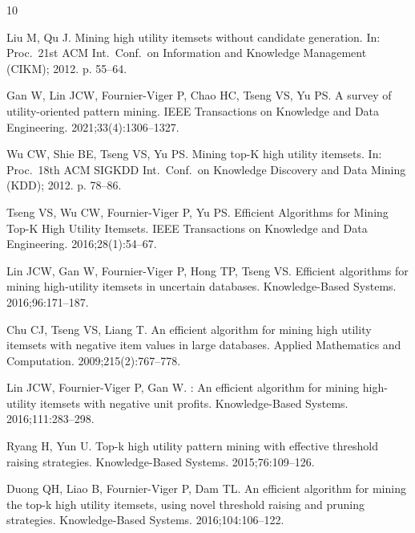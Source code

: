 \documentclass[pdflatex,sn-vancouver-num]{sn-jnl}
\theoremstyle{thmstyleone}%
\theoremstyle{thmstyletwo}%
\theoremstyle{thmstylethree}%
\begin{document}
\begin{thebibliography}{10}
\providecommand{\doi}[1]{\url{https://doi.org/#1}}
\bibcommenthead

Liu M, Qu J.
\newblock Mining high utility itemsets without candidate generation.
\newblock In: Proc.\ 21st ACM Int.\ Conf.\ on Information and Knowledge
  Management (CIKM); 2012. p. 55--64.

Gan W, Lin JCW, Fournier-Viger P, Chao HC, Tseng VS, Yu PS.
\newblock A survey of utility-oriented pattern mining.
\newblock IEEE Transactions on Knowledge and Data Engineering.
  2021;33(4):1306--1327.

Wu CW, Shie BE, Tseng VS, Yu PS.
\newblock Mining top-K high utility itemsets.
\newblock In: Proc.\ 18th ACM SIGKDD Int.\ Conf.\ on Knowledge Discovery and
  Data Mining (KDD); 2012. p. 78--86.

Tseng VS, Wu CW, Fournier-Viger P, Yu PS.
\newblock Efficient Algorithms for Mining Top-K High Utility Itemsets.
\newblock IEEE Transactions on Knowledge and Data Engineering.
  2016;28(1):54--67.

Lin JCW, Gan W, Fournier-Viger P, Hong TP, Tseng VS.
\newblock Efficient algorithms for mining high-utility itemsets in uncertain
  databases.
\newblock Knowledge-Based Systems. 2016;96:171--187.

Chu CJ, Tseng VS, Liang T.
\newblock An efficient algorithm for mining high utility itemsets with negative
  item values in large databases.
\newblock Applied Mathematics and Computation. 2009;215(2):767--778.

Lin JCW, Fournier-Viger P, Gan W.
: An efficient algorithm for mining high-utility itemsets with
  negative unit profits.
\newblock Knowledge-Based Systems. 2016;111:283--298.

Ryang H, Yun U.
\newblock Top-k high utility pattern mining with effective threshold raising
  strategies.
\newblock Knowledge-Based Systems. 2015;76:109--126.

Duong QH, Liao B, Fournier-Viger P, Dam TL.
\newblock An efficient algorithm for mining the top-k high utility itemsets,
  using novel threshold raising and pruning strategies.
\newblock Knowledge-Based Systems. 2016;104:106--122.


\end{thebibliography}
\end{document}
